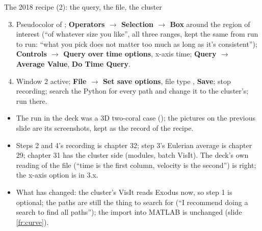 \documentclass[aspectratio=169,11pt]{beamer}
\newcommand{\gui}[1]{\textsf{\textbf{#1}}}
\begin{document}
\begin{frame}{The 2018 recipe (2): the query, the file, the cluster}
\label{fr:recipe18b}
\footnotesize
\begin{enumerate}
  \setcounter{enumi}{2}
  \item Pseudocolor of ; \gui{Operators $\to$ Selection $\to$ Box} around the region of interest (``of whatever size you like'', all three ranges, kept the same from run to run: ``what you pick does not matter too much as long as it's consistent''); \gui{Controls $\to$ Query over time options}, x-axis time; \gui{Query $\to$ Average Value}, \gui{Do Time Query}.
  \item Window 2 active; \gui{File $\to$ Set save options}, file type , \gui{Save}; stop recording; search the Python for every path and change it to the cluster's; run  there.
\end{enumerate}
\begin{itemize}
  \item The run in the deck was a 3D two-coral case (); the pictures on the previous slide are its screenshots, kept as the record of the recipe.
  \item Steps 2 and 4's recording is chapter 32; step 3's Eulerian average is chapter 29; chapter 31 has the cluster side (modules, batch VisIt). The deck's own reading of the  file (``time is the first column, velocity is the second'') is right; the x-axis option is  in 3.x.
  \item What has changed: the cluster's VisIt reads Exodus now, so step 1 is optional; the paths are still the thing to search for (``I recommend doing a search to find all paths''); the  import into MATLAB is unchanged (slide \ref{fr:curve}).
\end{itemize}
\end{frame}
\end{document}
